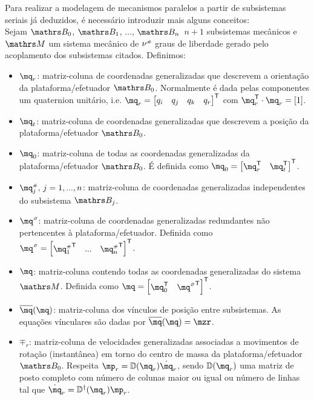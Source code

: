 \documentclass[a4paper,11pt,brazil,fleqn]{article}
\begin{document}
Para realizar a modelagem de mecanismos paralelos a partir de subsistemas seriais j\'a deduzidos, \'e necess\'ario introduzir mais alguns conceitos: \\

Sejam $\ssB_0$, $\ssB_1$, ..., $\ssB_{n} \,$ $n+1$ subsistemas mec\^anicos e $\ssM$ um sistema mec\^anico de $\nu^{\scriptscriptstyle \#}$ graus de liberdade gerado pelo acoplamento dos subsistemas citados. Definimos:

\begin{itemize}
\item $\mq_r$: matriz-coluna de coordenadas generalizadas que descrevem a orienta\c{c}\~ao da plataforma/efetuador $\ssB_0$. Normalmente \'e dada pelas componentes um quaternion unit\'ario, i.e. $\mq_r = \begin{bmatrix} q_i & q_j & q_k & q_r \end{bmatrix}^\msT $ com $ \mq_r^\msT \cdot \mq_r = \vct{1}$.
\item $\mq_t$: matriz-coluna de coordenadas generalizadas que descrevem a posi\c{c}\~ao da plataforma/efetuador $\ssB_0$.
\item $\mq_0$: matriz-coluna de todas as coordenadas generalizadas da plataforma/efetuador $\ssB_0$. \'E definida como $\mq_0 = \begin{bmatrix} \mq_r^\msT & \mq_t^\msT \end{bmatrix}^\msT$.
\item $\mq_j\ssh, \,j=1, ..., n$: matriz-coluna de coordenadas generalizadas independentes do subsistema  $\ssB_j$.
\item $\mq\hcir$: matriz-coluna de coordenadas generalizadas redundantes n\~ao pertencentes \`a plataforma/efetuador. Definida como $\mq\hcir = \begin{bmatrix}  {\mq_1\ssh}^\msT & ... & {\mq_{n}\ssh}^\msT \end{bmatrix}^\msT $.
\item $\mq$: matriz-coluna contendo todas as coordenadas generalizadas do sistema $\ssM$. Definida como $\mq = \begin{bmatrix} \mq_0^\msT & {\mq\hcir}^\msT \end{bmatrix}^\msT $.
\item $\overline{\mq}(\mq)$: matriz-coluna dos v\'inculos de posi\c{c}\~ao entre subsistemas. As equa\c{c}\~oes v\'inculares s\~ao dadas por $\overline{\mq}(\mq) = \mzr $.
\item $\mp_r$: matriz-coluna de velocidades generalizadas associadas a movimentos de rota\c{c}\~ao (instant\^anea) em torno do centro de massa da plataforma/efetuador $\ssB_0$. Respeita $\mp_r = \mD(\mq_r)\dot{\mq}_r$, sendo $\mD(\mq_r)$ uma matriz de posto completo com n\'umero de colunas maior ou igual ou n\'umero de linhas tal que $\dot{\mq}_r  = \mD^\msP(\mq_r) \mp_r$.

\end{itemize}
\end{document}

